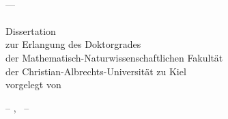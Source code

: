 \begin{titlepage}
\setlength{\hoffset}{0mm}
	\begin{addmargin}[-1cm]{-3cm}
    \begin{center}
        \large  

        \hfill

        \vfill

        \begingroup
            \color{Maroon}\spacedallcaps{\myTitle} \\ 
            --- \\
	    	\color{Maroon}\spacedallcaps{\mySubtitle} \\ 
	\vspace{.6cm}
        \endgroup
	\vspace{1.5cm}
	\vspace{7.2cm}
	\vspace{.6cm}
        \begingroup
            Dissertation\\
	    zur Erlangung des Doktorgrades\\
	    der Mathematisch-Naturwissenschaftlichen Fakult\"at\\
	    der Christian-Albrechts-Universit\"at zu Kiel\\
	    vorgelegt von\\
	\vspace{1.2cm}
        \endgroup     

	\spacedlowsmallcaps{\myName}

        \vfill

        

	\vspace{3cm}
        -- \myLocation, \myTime\ --
        \vfill                      

    \end{center}  
  \end{addmargin}       
\end{titlepage}   